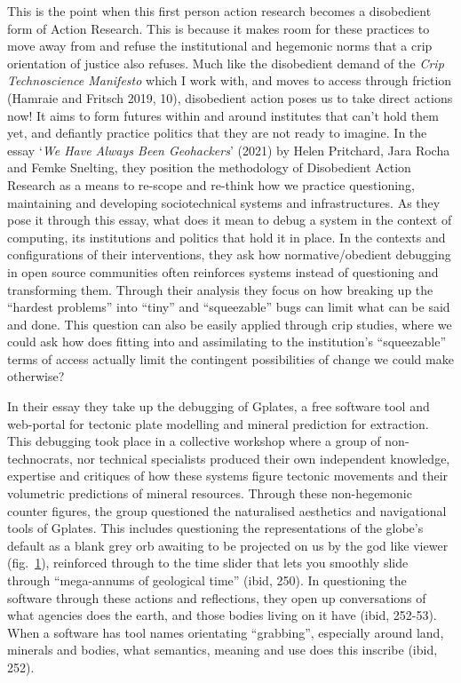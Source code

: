 This is the point when this first person action research becomes a
disobedient form of Action Research. This is because it makes room for
these practices to move away from and refuse the institutional and
hegemonic norms that a crip orientation of justice also refuses. Much
like the disobedient demand of the \emph{Crip Technoscience Manifesto}
which I work with, and moves to access through friction (Hamraie and
Fritsch 2019, 10), disobedient action poses us to take direct actions
now! It aims to form futures within and around institutes that can't
hold them yet, and defiantly practice politics that they are not ready
to imagine. In the essay `\emph{We Have Always Been Geohackers}' (2021)
by Helen Pritchard, Jara Rocha and Femke Snelting, they position the
methodology of Disobedient Action Research as a means to re-scope and
re-think how we practice questioning, maintaining and developing
sociotechnical systems and infrastructures. As they pose it through this
essay, what does it mean to debug a system in the context of computing,
its institutions and politics that hold it in place. In the contexts and
configurations of their interventions, they ask how normative/obedient
debugging in open source communities often reinforces systems instead of
questioning and transforming them. Through their analysis they focus on
how breaking up the ``hardest problems'' into ``tiny'' and
``squeezable'' bugs can limit what can be said and done. This question
can also be easily applied through crip studies, where we could ask how
does fitting into and assimilating to the institution's ``squeezable''
terms of access actually limit the contingent possibilities of change we
could make otherwise?

In their essay they take up the debugging of Gplates, a free software
tool and web-portal for tectonic plate modelling and mineral prediction
for extraction. This debugging took place in a collective workshop where
a group of non-technocrats, nor technical specialists produced their own
independent knowledge, expertise and critiques of how these systems
figure tectonic movements and their volumetric predictions of mineral
resources. Through these non-hegemonic counter figures, the group
questioned the naturalised aesthetics and navigational tools of Gplates.
This includes questioning the representations of the globe's default as
a blank grey orb awaiting to be projected on us by the god like viewer
(fig.~\protect\hyperlink{fig:grey}{1}), reinforced through to the time
slider that lets you smoothly slide through ``mega-annums of geological
time'' (ibid, 250). In questioning the software through these actions
and reflections, they open up conversations of what agencies does the
earth, and those bodies living on it have (ibid, 252-53). When a
software has tool names orientating ``grabbing'', especially around
land, minerals and bodies, what semantics, meaning and use does this
inscribe (ibid, 252).

